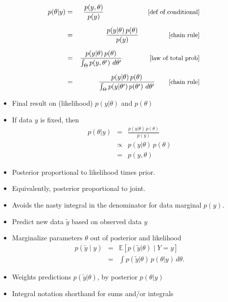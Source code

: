 \documentclass[10pt]{report}
\begin{document}
%
\vspace*{-4pt}
\begin{eqnarray*}
    p(\theta|y)
    & = & \frac{p(y,\theta)}{p(y)}
          \hspace*{64pt} \text{\small [def of conditional]}
    \\[6pt]
    & = & \frac{p(y|\theta) \, p(\theta)}{p(y)}
          \hspace*{44pt} \text{\small [chain rule]}
    \\[6pt]
    & = & \frac{p(y|\theta) \, p(\theta)}{\int_{\Theta} p(y,\theta') \ d\theta'}
          \hspace*{40pt} \text{\small [law of total prob]}
    \\[6pt]
    & = & \frac{p(y|\theta) \, p(\theta)}{\int_{\Theta} p(y|\theta') \,
      p(\theta') \ d\theta'}
          \hspace*{20pt} \text{\small [chain rule]}
\end{eqnarray*}

\begin{itemize}
\item {} Final result  on
   (likelihood) $p(y|\theta)$ and 
  $p(\theta)$
\end{itemize}


%
\begin{itemize}
\item If data $y$ is fixed, then
\begin{eqnarray*}
p(\theta|y)
& = & \frac{p(y|\theta) \, p(\theta)}{p(y)}
\\[6pt]
& \propto & p(y|\theta) \, p(\theta)
\\[6pt]
& = & p(y,\theta)
\end{eqnarray*}
\item Posterior proportional to likelihood times prior.
\item Equivalently, posterior proportional to joint.
\vfill
\item Avoids the nasty integral in the denominator for data marginal $p(y)$.
\end{itemize}


%
\begin{itemize}
\item Predict new data $\tilde{y}$ based on observed data $y$
\item Marginalize parameters $\theta$ out of posterior and likelihood
\begin{eqnarray*}
p(\tilde{y} \mid y)
& = & \mathbb{E}[p(\tilde{y} | \theta) \mid Y = y]
\\[6pt]
& = &
\int p(\tilde{y} | \theta) \, p(\theta | y) \, d\theta.
\end{eqnarray*}
\item Weights predictions $p(\tilde{y}|\theta)$,
by posterior $p(\theta|y)$
\item Integral notation shorthand for sums and/or integrals
\end{itemize}
\end{document}
